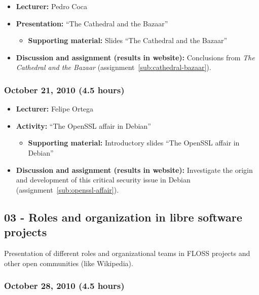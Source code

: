 \documentclass[a4paper]{article}
\begin{document}
\begin{itemize}
\item \textbf{Lecturer:} Pedro Coca
\item \textbf{Presentation:} ``The Cathedral and the Bazaar''
  \begin{itemize}
  \item \textbf{Supporting material:} Slides ``The Cathedral and the Bazaar''
  \end{itemize}
\item \textbf{Discussion and assignment (results in website):} Conclusions from \textit{The Cathedral and the Bazaar} (assignment~\ref{sub:cathedral-bazaar}).
\end{itemize}

\subsubsection{October 21, 2010 (4.5 hours)}

\begin{itemize}
\item \textbf{Lecturer:} Felipe Ortega
\item \textbf{Activity:} ``The OpenSSL affair in Debian''
  \begin{itemize}
  \item \textbf{Supporting material:} Introductory slides ``The OpenSSL affair in Debian''
  \end{itemize}
\item \textbf{Discussion and assignment (results in website):} Investigate the origin and development of this critical security issue in Debian (assignment~\ref{sub:openssl-affair}).
\end{itemize}

\subsection{03 - Roles and organization in libre software projects}

Presentation of different roles and organizational teams in FLOSS projects and other open communities (like Wikipedia).

\subsubsection{October 28, 2010 (4.5 hours)}
\end{document}
